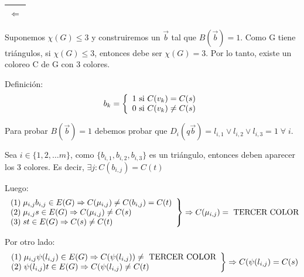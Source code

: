 \documentclass[12pt,a4paper]{report}
\newcounter{neq}
\begin{document}
			\pagebreak
			\begin{tabular}{|c|} \hline $\Leftarrow$ \\\hline \end{tabular}
				\par Suponemos $\chi(G) \leq 3$ y construiremos un $\overrightarrow{b}$ tal que $B(\overrightarrow{b}) = 1$. Como G tiene triángulos, si $\chi (G) \leq 3$, entonces debe ser $\chi (G) = 3$. Por lo tanto, existe un coloreo C de G con 3 colores.
				\vspace{3mm}
				\par Definición:
				\begin{equation*}
					b_{k} =
		  		\left \lbrace
		  		\begin{array}{l}
		    		1 \textup{ si } C(v_{k}) = C(s) \\
		    		0 \textup{ si } C(v_{k}) \neq C(s)
		  		\end{array}
		  		\right.
				\end{equation*}
				\par Para probar $B(\overrightarrow{b}) = 1$ debemos probar que $D_{i}(q\overrightarrow{b}) = l_{i, 1} \vee l_{i, 2} \vee l_{i, 3} = 1 \; \forall \; i$.
				\par Sea $i \in \lbrace	1, 2, \dotsc m \rbrace$, como $ \lbrace b_{i, 1}, b_{i, 2}, b_{i, 3} \rbrace$ es un triángulo, entonces deben aparecer los 3 colores. Es decir, $\exists j : C(b_{i, j}) = C(t)$
				\vspace{3mm}
				\par Luego:
				\begin{equation*}
		  		\left.
		  		\begin{array}{l}
		    		(1) \; \mu_{i, j} b_{i, j} \in E(G) \Rightarrow C(\mu_{i, j}) \neq C(b_{i, j}) = C(t) \\
		    		(2) \; \mu_{i, j} s \in E(G) \Rightarrow C(\mu_{i, j}) \neq C(s) \\
		    		(3) \; s t \in E(G) \Rightarrow C(s) \neq C(t)
		  		\end{array}
		 			\right\rbrace
		 			\Rightarrow C(\mu_{i, j}) = \textup{ TERCER COLOR}
				\end{equation*}

				\par Por otro lado:
				\begin{equation*}
		  		\left.
		  		\begin{array}{l}
		    	 	(1) \; \mu_{i, j} \psi(l_{i, j}) \in E(G) \Rightarrow C(\psi(l_{i, j})) \neq \textup{ TERCER COLOR} \\
		    	 	(2) \; \psi(l_{i, j}) t \in E(G) \Rightarrow C(\psi(l_{i, j}) \neq C(t)
		  		\end{array}
		 		 	\right\rbrace
		 			\Rightarrow C(\psi(l_{i, j}) = C(s)
				\end{equation*}
\end{document}
